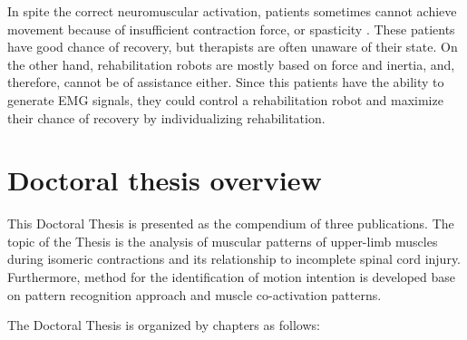 In spite the correct neuromuscular activation, patients sometimes cannot achieve movement because of insufficient contraction force, or spasticity \citep{Liu2016b}. These patients have good chance of recovery, but therapists are often unaware of their state. On the other hand, rehabilitation robots are mostly based on force and inertia, and, therefore, cannot be of assistance either. Since this patients have the ability to generate EMG signals, they could control a rehabilitation robot and maximize their chance of recovery by individualizing rehabilitation.




\section {Doctoral thesis overview}

This Doctoral Thesis is presented as the compendium of three publications. The topic of the Thesis is the analysis of muscular patterns of upper-limb muscles during isomeric contractions and its relationship to incomplete spinal cord injury. Furthermore, method for the identification of motion intention is developed base on pattern recognition approach and muscle co-activation patterns. 

The Doctoral Thesis is organized by chapters as follows:

